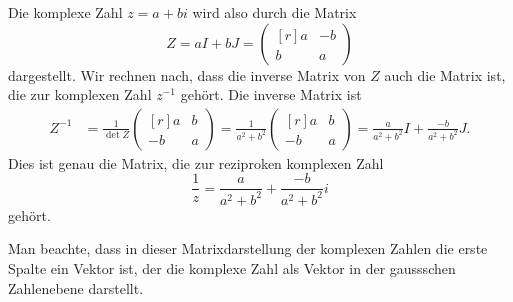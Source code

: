 Die komplexe Zahl $z=a+bi$ wird also durch die Matrix
\[
Z = aI+bJ
=
\begin{pmatrix*}[r]
a&-b\\
b& a
\end{pmatrix*}
\]
dargestellt.
Wir rechnen nach, dass die inverse Matrix von $Z$ auch die
Matrix ist, die zur komplexen Zahl $z^{-1}$ gehört.
Die inverse Matrix ist
\begin{align*}
Z^{-1}
&=
\frac{1}{\det Z}
\begin{pmatrix*}[r]
 a & b \\
-b & a
\end{pmatrix*}
=
\frac{1}{a^2+b^2}
\begin{pmatrix*}[r]
 a & b \\
-b & a
\end{pmatrix*}
=
\frac{a}{a^2+b^2}I
+
\frac{-b}{a^2+b^2}J.
\end{align*}
Dies ist genau die Matrix, die zur reziproken komplexen Zahl
\[
\frac{1}{z}
=
\frac{a}{a^2+b^2}
+
\frac{-b}{a^2+b^2}i
\] 
gehört.

Man beachte, dass in dieser Matrixdarstellung der komplexen Zahlen
die erste Spalte ein Vektor ist, der die komplexe Zahl als Vektor
in der gaussschen Zahlenebene darstellt.
